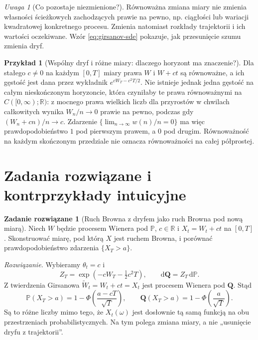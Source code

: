 \documentclass[11pt,a4paper,oneside]{report}
\numberwithin{equation}{chapter}
\theoremstyle{plain}
\theoremstyle{definition}
\newtheorem{przyklad}{Przykład}[chapter]
\newtheorem{zadanie}{Zadanie rozwiązane}[chapter]
\theoremstyle{remark}
\newtheorem{uwaga}{Uwaga}[chapter]
\newcommand{\R}{\mathbb{R}}
\newcommand{\Prob}{\mathbb{P}}
\newcommand{\dd}{\mathrm{d}}
\begin{document}
\begin{uwaga}[Co pozostaje niezmienione?]
Równoważna zmiana miary nie zmienia własności
ścieżkowych zachodzących prawie na pewno, np. ciągłości
lub wariacji kwadratowej konkretnego procesu.
Zmienia natomiast rozkłady trajektorii i ich wartości
oczekiwane. Wzór \eqref{eq:girsanov-sde} pokazuje,
jak przesunięcie szumu zmienia dryf.
\end{uwaga}

\begin{przyklad}[Wspólny dryf i różne miary: dlaczego horyzont ma znaczenie?]
Dla stałego $c\ne0$ na każdym $[0,T]$ miary prawa
$W$ i $W+ct$ są równoważne, a ich gęstość jest dana
przez wykładnik $e^{cW_T-c^2T/2}$. Nie istnieje jednak
jedna gęstość na całym nieskończonym horyzoncie,
która czyniłaby te prawa równoważnymi na
$C([0,\infty);\R)$: z mocnego prawa wielkich liczb
dla przyrostów w chwilach całkowitych wynika
$W_n/n\to0$ prawie na pewno, podczas gdy
$(W_n+cn)/n\to c$. Zdarzenie
$\{\lim_{n\to\infty}w(n)/n=0\}$ ma więc prawdopodobieństwo
$1$ pod pierwszym prawem, a $0$ pod drugim.
Równoważność na każdym skończonym przedziale nie oznacza
równoważności na całej półprostej.
\end{przyklad}

\section{Zadania rozwiązane i kontrprzykłady intuicyjne}\label{sec:volIII:08:05}

\begin{zadanie}[Ruch Browna z dryfem jako ruch Browna pod nową miarą]
Niech $W$ będzie procesem Wienera pod $\Prob$, $c\in\R$
i $X_t=W_t+ct$ na $[0,T]$. Skonstruować miarę,
pod którą $X$ jest ruchem Browna, i porównać
prawdopodobieństwo zdarzenia $\{X_T>a\}$.

\emph{Rozwiązanie.} Wybieramy $\theta_t=c$ i
\[
Z_T=\exp(-cW_T-\tfrac12c^2T),\qquad
\dd\mathbf Q=Z_T\,\dd\Prob.
\]
Z twierdzenia Girsanowa $\widetilde W_t=W_t+ct=X_t$
jest procesem Wienera pod $\mathbf Q$. Stąd
\[
\Prob(X_T>a)=1-\Phi\left(\frac{a-cT}{\sqrt T}\right),
\qquad
\mathbf Q(X_T>a)=1-\Phi\left(\frac a{\sqrt T}\right).
\]
Są to różne liczby mimo tego, że $X_t(\omega)$
jest dosłownie tą samą funkcją na obu przestrzeniach
probabilistycznych. Na tym polega zmiana miary, a nie
„usunięcie dryfu z trajektorii”.
\end{zadanie}
\end{document}
